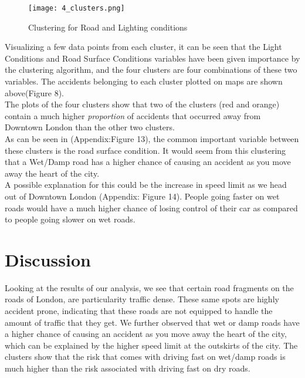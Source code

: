 \documentclass{neu_handout}
\begin{document}
\begin{figure}[!htb]
    \begin{center}
      \texttt{[image: 4\_clusters.png]}
      \caption{Clustering for Road and Lighting conditions}
    \end{center}
\end{figure}

Visualizing a few data points from each cluster, it can be seen that the Light Conditions and Road Surface Conditions variables have been given importance by the clustering algorithm, and the four clusters are four combinations of these two variables. The accidents belonging to each cluster plotted on maps are shown above(Figure 8). \\ 



The plots of the four clusters show that two of the clusters (red and orange) contain a much higher \textit{proportion} of accidents that occurred away from Downtown London than the other two clusters. \\


As can be seen in (Appendix:Figure 13), the common important variable between these clusters is the road surface condition. It would seem from this clustering that a Wet/Damp road has a higher chance of causing an accident as you move away the heart of the city. \\ 

A possible explanation for this could be the increase in speed limit as we head out of Downtown London (Appendix: Figure 14). People going faster on wet roads would have a much higher chance of losing control of their car as compared to people going slower on wet roads. \\

\section{Discussion}
Looking at the results of our analysis, we see that certain road fragments on the roads of London, are particularity traffic dense. These same spots are highly accident prone, indicating that these roads are not equipped to handle the amount of traffic that they get. We further observed that wet or damp roads have a higher chance of causing an accident as you move away the heart of the city, which can be explained by the higher speed limit at the outskirts of the city. The clusters show that the risk that comes with driving fast on wet/damp roads is much higher than the risk associated with driving fast on dry roads. \\
\end{document}
